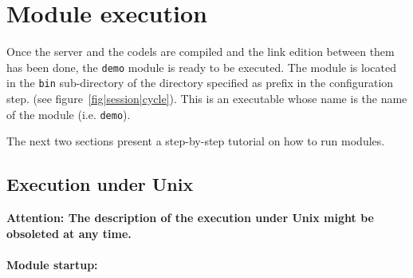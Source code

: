 \section{Module execution}
\label{sec|session|exec}

Once the server and the codels are compiled and  the link edition between
them has been done,  the {\tt demo} module is  ready to be executed.  The
module is located in the  \texttt{bin} sub-directory of the directory
specified as prefix in the 
configuration step.     (see
figure~\ref{fig|session|cycle}). This is an executable whose name is
the   name   of the     module  (i.e. \texttt{demo}).

The   next two sections   present a step-by-step   tutorial on how to run
modules.

\subsection{Execution under Unix}
\label{ssec|exec|unix}

{\bf  Attention:  The description of  the execution   under Unix might be
obsoleted at any time.}

\paragraph{Module startup:}

